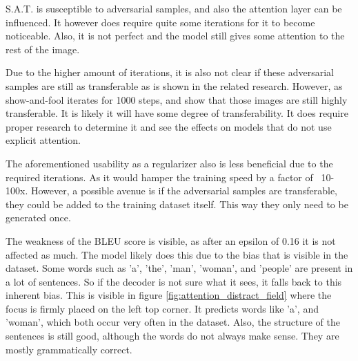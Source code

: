 S.A.T. is susceptible to adversarial samples, and also the attention layer can be influenced. It however does require quite some iterations for it to become noticeable. Also, it is not perfect and the model still gives some attention to the rest of the image.

Due to the higher amount of iterations, it is also not clear if these adversarial samples are still as transferable as is shown in the related research. However, as show-and-fool\cite{Hongge} iterates for 1000 steps, and show that those images are still highly transferable. It is likely it will have some degree of transferability. It does require proper research to determine it and see the effects on models that do not use explicit attention.

The aforementioned usability as a regularizer also is less beneficial due to the required iterations. As it would hamper the training speed by a factor of ~10-100x. However, a possible avenue is if the adversarial samples are transferable, they could be added to the training dataset itself. This way they only need to be generated once.

The weakness of the BLEU score is visible, as after an epsilon of 0.16 it is not affected as much. The model likely does this due to the bias that is visible in the dataset. Some words such as 'a', 'the', 'man', 'woman', and 'people' are present in a lot of sentences. So if the decoder is not sure what it sees, it falls back to this inherent bias. This is visible in figure \ref{fig:attention_distract_field} where the focus is firmly placed on the left top corner. It predicts words like 'a', and 'woman', which both occur very often in the dataset. Also, the structure of the sentences is still good, although the words do not always make sense. They are mostly grammatically correct.
